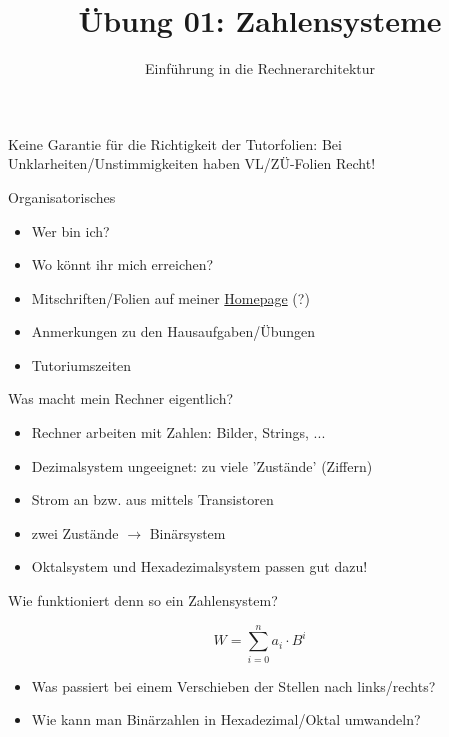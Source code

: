 

\title{Übung 01: Zahlensysteme}
\subtitle{Einführung in die Rechnerarchitektur}
\date{}



\maketitle

\begin{frame}[c]{}{}
	\begin{center}
		\LARGE  Keine Garantie für die Richtigkeit der Tutorfolien: Bei Unklarheiten/Unstimmigkeiten
		haben VL/ZÜ-Folien Recht!
	\end{center}
\end{frame}

\begin{frame}[c]{Organisatorisches}{}
	\begin{itemize}
		\item Wer bin ich?
		\item Wo könnt ihr mich erreichen?
		\item Mitschriften/Folien auf meiner \href{https://home.in.tum.de/~ladu/}{Homepage} (?)
		\item Anmerkungen zu den Hausaufgaben/Übungen
		\item Tutoriumszeiten
	\end{itemize}
\end{frame}

\begin{frame}[c]{Was macht mein Rechner eigentlich?}{}
	\begin{itemize}
		\item Rechner arbeiten mit Zahlen: Bilder, Strings, ...
		\item Dezimalsystem ungeeignet: zu viele 'Zustände' (Ziffern)
		\item Strom an bzw. aus mittels Transistoren
		\item zwei Zustände $\rightarrow$ Binärsystem
		\item Oktalsystem und Hexadezimalsystem passen gut dazu!
	\end{itemize}
\end{frame}

\begin{frame}[c]{Wie funktioniert denn so ein Zahlensystem?}{}
	\begin{center}
		\LARGE $$W=\sum_{i=0}^na_i\cdot B^i$$
	\end{center}
	\hspace{1cm}
	\begin{itemize}
		\item Was passiert bei einem Verschieben der Stellen nach links/rechts?
		\item Wie kann man Binärzahlen in Hexadezimal/Oktal umwandeln?
	\end{itemize}
\end{frame}

